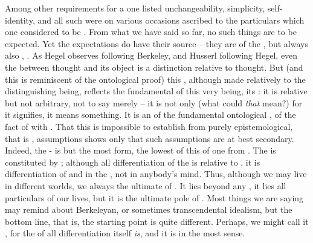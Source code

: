 Among other requirements for a  one listed unchangeability,
simplicity, self-identity, and all such were on various occasions ascribed to
the particulars which one considered to be .  From what we
have said so far, no such things are to be
expected. Yet the 
expectations do have their source -- they are  of the
, but always also , .
%
As Hegel observes following Berkeley, and Husserl following Hegel, even the
 between thought 
and its object is a distinction relative to thought.  But (and this is
reminiscent of the ontological proof) this , although made
relatively to the distinguishing being, reflects the fundamental
 of this very being, its : it is relative but
not arbitrary, not to say merely  -- it is not only  (what could {\em that} mean?) for it {signifies}, it means
something. It is an  of the fundamental ontological
, of the fact of  with 
. That this is impossible to establish from purely
epistemological, that is , 
assumptions shows only that such assumptions are at best secondary. Indeed, the
-  is but the most  form, the
lowest  of this   of one from .
%
The  is constituted by
; although all differentiation of the  is
relative to , it is differentiation of and in the ,
not in anybody's mind. Thus, although we may live in different worlds, we always
 the ultimate  of . It lies beyond any
, it lies  all particulars of our lives, but it
is the ultimate pole of . Most things we are
saying may remind about Berkeleyan, or sometimes transcendental idealism, but
the bottom line, that is, the starting point is quite different. Perhaps, we
might call it , for the  of all
differentiation itself {\em is}, and it is in the most 
sense.


